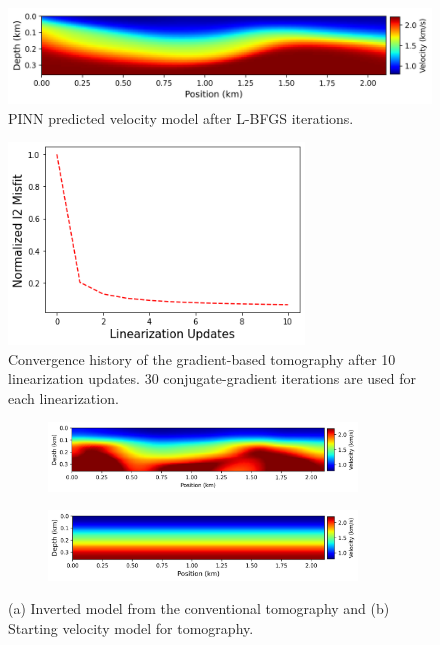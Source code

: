 \begin{figure}
 \centering
 \includegraphics[width=1.0\textwidth]{figures/chap03_pinn_enabled/pinn_folded_result} 
 \caption{PINN predicted velocity model after L-BFGS iterations.}
 \label{fig:pinn_folded_result}
\end{figure}

\begin{figure}
 \centering
 \includegraphics[width=0.7\textwidth]{figures/chap03_pinn_enabled/convergence_curve1} 
 \caption{Convergence history of the gradient-based tomography after 10 linearization updates. 30 conjugate-gradient iterations are used for each linearization.}
 \label{fig:convergence_curve1}
\end{figure}

\begin{figure}
       \centering
       \begin{subfigure}[b]{1.\textwidth}
               \centering
               \includegraphics[width=0.9\textwidth]{figures/chap03_pinn_enabled/folded_tomo} 
               \caption{}
               \label{fig:folded_tomo}
       \end{subfigure}
       \begin{subfigure}[b]{1.\textwidth}
               \centering
               \includegraphics[width=0.9\textwidth]{figures/chap03_pinn_enabled/folded_init}
               \caption{}
               \label{fig:folded_init}
       \end{subfigure}
       \caption{(a) Inverted model from the conventional tomography and (b) Starting velocity model for tomography.}
       \label{fig:std_tomo1}
\end{figure}

